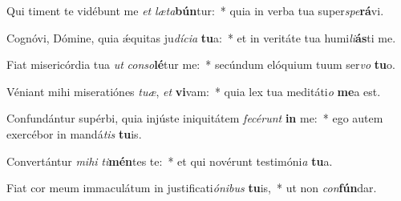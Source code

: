 \item Qui timent te vidébunt me \textit{et} \textit{læ}\textit{ta}\textbf{bún}tur:~* quia in verba tua super\textit{spe}\textbf{rá}vi.
\item Cognóvi, Dómine, quia ǽquitas ju\textit{dí}\textit{ci}\textit{a} \textbf{tu}a:~* et in veritáte tua humi\textit{li}\textbf{ás}ti me.
\item Fiat misericórdia tua \textit{ut} \textit{con}\textit{so}\textbf{lé}tur me:~* secúndum elóquium tuum ser\textit{vo} \textbf{tu}o.
\item Véniant mihi miseratiónes \textit{tu}\textit{æ}, \textit{et} \textbf{vi}vam:~* quia lex tua meditáti\textit{o} \textbf{me}a est.
\item Confundántur supérbi, quia injúste iniquitátem \textit{fe}\textit{cé}\textit{runt} \textbf{in} me:~* ego autem exercébor in mandá\textit{tis} \textbf{tu}is.
\item Convertántur \textit{mi}\textit{hi} \textit{ti}\textbf{mén}tes te:~* et qui novérunt testimóni\textit{a} \textbf{tu}a.
\item Fiat cor meum immaculátum in justificati\textit{ó}\textit{ni}\textit{bus} \textbf{tu}is,~* ut non \textit{con}\textbf{fún}dar.
